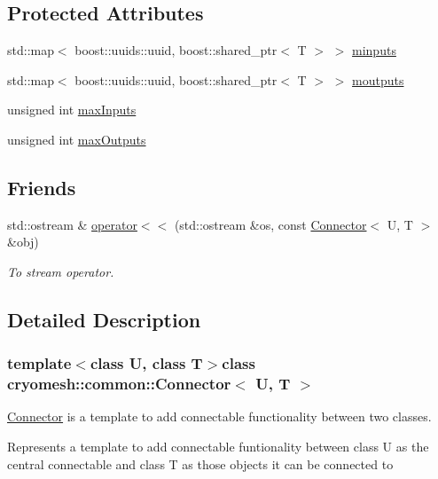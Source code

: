 \subsection*{\-Protected \-Attributes}
\begin{DoxyCompactItemize}
\item 
std\-::map$<$ boost\-::uuids\-::uuid, \*
boost\-::shared\-\_\-ptr$<$ \-T $>$ $>$ \hyperlink{classcryomesh_1_1common_1_1Connector_a4b53045b5f70f35b9cf8838474bdbc97}{minputs}
\item 
std\-::map$<$ boost\-::uuids\-::uuid, \*
boost\-::shared\-\_\-ptr$<$ \-T $>$ $>$ \hyperlink{classcryomesh_1_1common_1_1Connector_a3a7175d8c33a8f5cd72592748c6dc15f}{moutputs}
\item 
unsigned int \hyperlink{classcryomesh_1_1common_1_1Connector_aed34a9f056b3f718cbf5669717d46694}{max\-Inputs}
\item 
unsigned int \hyperlink{classcryomesh_1_1common_1_1Connector_aa30303b7f79bab1364ff8ba53ea3fb25}{max\-Outputs}
\end{DoxyCompactItemize}
\subsection*{\-Friends}
\begin{DoxyCompactItemize}
\item 
std\-::ostream \& \hyperlink{classcryomesh_1_1common_1_1Connector_a821dbf25de8022d484c33728df5a69f5}{operator$<$$<$} (std\-::ostream \&os, const \hyperlink{classcryomesh_1_1common_1_1Connector}{\-Connector}$<$ \-U, \-T $>$ \&obj)
\begin{DoxyCompactList}\small\item\em \-To stream operator. \end{DoxyCompactList}\end{DoxyCompactItemize}


\subsection{\-Detailed \-Description}
\subsubsection*{template$<$class \-U, class \-T$>$class cryomesh\-::common\-::\-Connector$<$ U, T $>$}

\hyperlink{classcryomesh_1_1common_1_1Connector}{\-Connector} is a template to add connectable functionality between two classes. 

\-Represents a template to add connectable funtionality between class \-U as the central connectable and class \-T as those objects it can be connected to 

